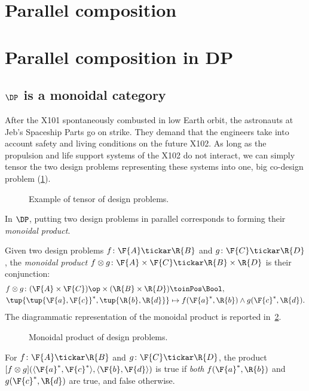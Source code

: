 \section{Parallel composition}
\section{Parallel composition in DP}
\subsection{$\DP$ is a monoidal category}
\begin{example}
After the X101 spontaneously combusted in low Earth orbit, the astronauts at Jeb's Spaceship Parts go on strike. They demand that the engineers take into account safety and living conditions on the future X102. As long as the propulsion and life support systems of the X102 do not interact, we can simply tensor the two design problems representing these systems into one, big co-design problem (\cref{fig:examplemonoidal}).
\begin{figure}[h!]
\begin{center}
\end{center}
\caption{Example of tensor of design problems. \label{fig:examplemonoidal}}
\end{figure}
\end{example}
In $\DP$, putting two design problems in parallel corresponds to forming their \emph{monoidal product}. 

\begin{definition}\label{def:monoidalproduct}
Given two design problems $f \colon \F{A} \tickar \R{B}$ and $g \colon \F{C} \tickar \R{D}$,
the \emph{monoidal product} $f\otimes g \colon \F{A} \times \F{C} \tickar \R{B} \times \R{D}$ is their conjunction:
\begin{equation}
\begin{aligned}
f \otimes g \colon (\F{A} \times \F{C})\op \times (\R{B} \times \R{D}) & \toinPos \Bool, \\
\tup{\tup{\F{a},\F{c}}^*,\tup{\R{b},\R{d}}} &\mapsto f(\F{a}^*,\R{b}) \wedge g(\F{c}^*,\R{d}). 
\end{aligned}
\end{equation}
The diagrammatic representation of the monoidal product is reported in~\cref{fig:dpmonoidal}.
\begin{figure}[h!]
\begin{center}
\end{center}
\caption{Monoidal product of design problems. \label{fig:dpmonoidal}}
\end{figure}
\end{definition}
\begin{remark}
For $f \colon \F{A} \tickar \R{B}$ and $g \colon \F{C} \tickar \R{D}$, the product $[f \otimes g](\langle \F{a}^*, \F{c}^*\rangle, \langle \F{b},\F{d} \rangle)$ is true if \emph{both} $f(\F{a}^*,\R{b})$ and $g(\F{c}^*,\R{d})$ are true, and false otherwise.
\end{remark}


